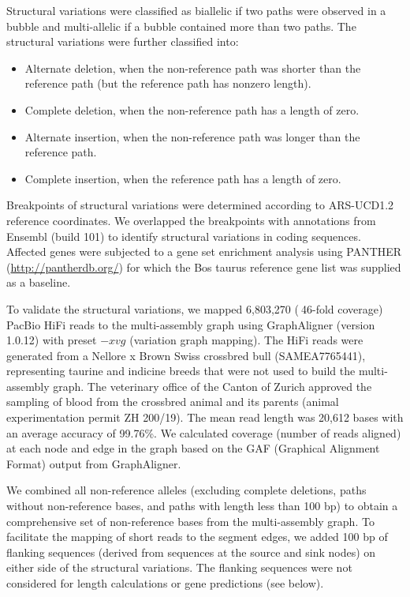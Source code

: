 \documentclass[../main.tex]{subfiles}
\begin{document}
Structural variations were classified as biallelic if two paths were observed in a bubble and multi-allelic if a bubble contained more than two paths. The structural variations were further classified into:

\begin{itemize}
    \item Alternate deletion, when the non-reference path was shorter than the reference path (but the reference path has nonzero length).
    \item Complete deletion, when the non-reference path has a length of zero.
    \item Alternate insertion, when the non-reference path was longer than the reference path.
    \item Complete insertion, when the reference path has a length of zero.
\end{itemize}

Breakpoints of structural variations were determined according to ARS-UCD1.2 reference coordinates. We overlapped the breakpoints with annotations from Ensembl (build 101) to identify structural variations in coding sequences. Affected genes were subjected to a gene set enrichment analysis using PANTHER (\url{http://pantherdb.org/}) \citep{mi2019panther} for which the Bos taurus reference gene list was supplied as a baseline. 

To validate the structural variations, we mapped 6,803,270 ($~$46-fold coverage) PacBio HiFi reads to the multi-assembly graph using GraphAligner (version 1.0.12) \citep{rautiainen2020graphaligner} with preset $-x vg$ (variation graph mapping). The HiFi reads were generated from a Nellore x Brown Swiss crossbred bull (SAMEA7765441), representing taurine and indicine breeds that were not used to build the multi-assembly graph. The veterinary office of the Canton of Zurich approved the sampling of blood from the crossbred animal and its parents (animal experimentation permit ZH 200/19). The mean read length was 20,612 bases with an average accuracy of 99.76\%. We calculated coverage (number of reads aligned) at each node and edge in the graph based on the GAF (Graphical Alignment Format) output from GraphAligner.  

We combined all non-reference alleles (excluding complete deletions, paths without non-reference bases, and paths with length less than 100 bp) to obtain a comprehensive set of non-reference bases from the multi-assembly graph. To facilitate the mapping of short reads to the segment edges, we added 100 bp of flanking sequences (derived from sequences at the source and sink nodes) on either side of the structural variations. The flanking sequences were not considered for length calculations or gene predictions (see below). 
\end{document}
